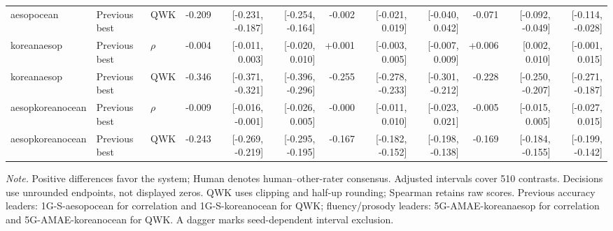 \documentclass[10pt]{article}
\begin{document}
\begin{landscape}
\begin{longtable}{@{}lllrrrrrrrrr@{}}
aesopocean & Previous best & QWK & -0.209 & [-0.231, -0.187] & [-0.254, -0.164] & -0.002 & [-0.021, 0.019] & [-0.040, 0.042] & -0.071 & [-0.092, -0.049] & [-0.114, -0.028]\\
koreanaesop & Previous best & $\rho$ & -0.004 & [-0.011, 0.003] & [-0.020, 0.010] & +0.001 & [-0.003, 0.005] & [-0.007, 0.009] & +0.006 & [0.002, 0.010] & [-0.001, 0.015]\\
koreanaesop & Previous best & QWK & -0.346 & [-0.371, -0.321] & [-0.396, -0.296] & -0.255 & [-0.278, -0.233] & [-0.301, -0.212] & -0.228 & [-0.250, -0.207] & [-0.271, -0.187]\\
aesopkoreanocean & Previous best & $\rho$ & -0.009 & [-0.016, -0.001] & [-0.026, 0.005] & -0.000 & [-0.011, 0.010] & [-0.023, 0.021] & -0.005 & [-0.015, 0.005] & [-0.027, 0.015]\\
aesopkoreanocean & Previous best & QWK & -0.243 & [-0.269, -0.219] & [-0.295, -0.195] & -0.167 & [-0.182, -0.152] & [-0.198, -0.138] & -0.169 & [-0.184, -0.155] & [-0.199, -0.142]\\
\end{longtable}
\noindent\textit{Note.} Positive differences favor the system; Human denotes human--other-rater consensus. Adjusted intervals cover 510 contrasts. Decisions use unrounded endpoints, not displayed zeros. QWK uses clipping and half-up rounding; Spearman retains raw scores. Previous accuracy leaders: 1G-S-aesopocean for correlation and 1G-S-koreanocean for QWK; fluency/prosody leaders: 5G-AMAE-koreanaesop for correlation and 5G-AMAE-koreanocean for QWK. A dagger marks seed-dependent interval exclusion.
\endgroup
\end{landscape}
\end{document}
